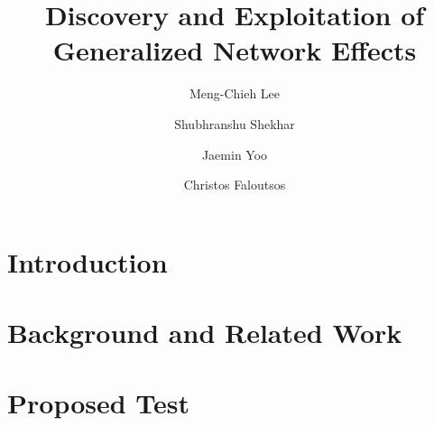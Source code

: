 \documentclass[sigconf, nonacm]{acmart}
\begin{document}
\title{Discovery and Exploitation of Generalized Network Effects}


\author{Meng-Chieh Lee}
\author{Shubhranshu Shekhar}
\author{Jaemin Yoo}
\author{Christos Faloutsos}

\begin{abstract}

\end{abstract}

\maketitle


\section{Introduction}
\label{sec:intro}


\section{Background and Related Work}
\label{sec:background}


\section{Proposed \nef Test}
\label{sec:netest}

\end{document}
